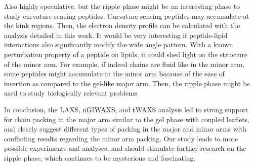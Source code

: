 Also highly speculative, but the ripple phase might be an interesting phase
to study curvature sensing peptides. 
Curvature sensing peptides
may accumulate at the kink regions. Then, the electron density profile
can be calculated with the analysis detailed in this work. It would 
be very interesting if peptide-lipid interactions also significantly 
modify the wide angle pattern. With a known perturbation property of 
a peptide on lipids, it could shed light on the structure of the minor arm.
For example, if indeed chains are fluid like in the minor arm, some peptides
might accumulate in the minor arm because of the ease of 
insertion as compared to the gel-like major arm.
Then, the ripple phase might be used to study biologically relevant problems.

In conclusion, the LAXS, nGIWAXS, and tWAXS analysis led to strong support 
for chain packing in the major arm similar to the gel phase with coupled leaflets,
and clearly suggest different types of packing in the 
major and minor arms with
conflicting results regarding the minor arm packing.
Our study leads to more possible experiments and analyses, and should 
stimulate further research on the ripple phase, which continues to 
be mysterious and fascinating.
